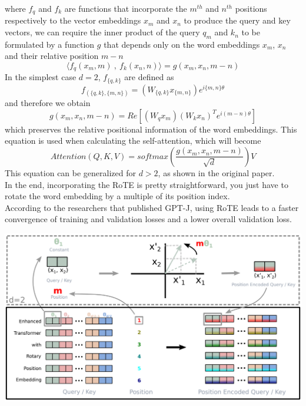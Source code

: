 where $f_q$ and $f_k$ are functions that incorporate the $m^{th}$ and $n^{th}$ positions respectively to the vector embeddings $x_m$ and $x_n$ to produce the query and key vectors, we can require the inner product of the query $q_m$ and $k_n$ to be formulated by a function $g$ that depends only on the word embeddings $x_m$, $x_n$ and their relative position $m - n$
\begin{equation*}
    \langle f_q(x_m, m) \: , \: f_k(x_n, n) \rangle = g(x_m,x_n,m-n)
\end{equation*}
In the simplest case $d=2$, $f_{\{q,k\}}$ are defined as
\begin{equation*}
    f_{(\{q,k\}, \{m,n\})} = (W_{\{q,k\}}x_{\{m,n\}})e^{i\{m,n\}\theta}
\end{equation*}
and therefore we obtain
\begin{equation*}
    g(x_m, x_n, m - n) = Re[(W_qx_m)(W_kx_n)^Te^{i(m-n)\theta}]
\end{equation*}
which preserves the relative positional information of the word embeddings. This equation is used when calculating the self-attention, which will become
\begin{equation*}
    Attention(Q,K,V) = softmax\left(\frac{g(x_m, x_n, m - n)}{\sqrt{d}}\right)V
\end{equation*}
This equation can be generalized for $d > 2$, as shown in the original paper. \\
In the end, incorporating the RoTE is pretty straightforward, you just have to rotate the word embedding by a multiple of its position index. \\
According to the researchers that published GPT-J\cite{rope-eleutherai}, using RoTE leads to a faster convergence of training and validation losses and a lower overall validation loss.

\noindent
\begin{minipage}{\linewidth}
    \includegraphics[width=\linewidth]{images/rotary_embedding_from_paper.PNG}
\end{minipage}%
